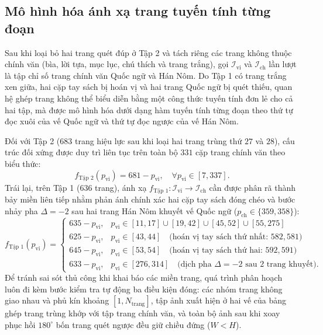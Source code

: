 \subsection{Mô hình hóa ánh xạ trang tuyến tính từng đoạn}

Sau khi loại bỏ hai trang quét đúp ở Tập 2 và tách riêng các trang không thuộc chính văn (bìa, lời tựa, mục lục, chú thích và trang trắng), gọi $\mathcal{I}_{\text{vi}}$ và $\mathcal{I}_{\text{ch}}$ lần lượt là tập chỉ số trang chính văn Quốc ngữ và Hán Nôm. Do Tập 1 có trang trắng xen giữa, hai cặp tay sách bị hoán vị và hai trang Quốc ngữ bị quét thiếu, quan hệ ghép trang không thể biểu diễn bằng một công thức tuyến tính đơn lẻ cho cả hai tập, mà được mô hình hóa dưới dạng hàm tuyến tính từng đoạn theo thứ tự đọc xuôi của vế Quốc ngữ và thứ tự đọc ngược của vế Hán Nôm.

Đối với Tập 2 ($683$ trang hiệu lực sau khi loại hai trang trùng thứ $27$ và $28$), cấu trúc đối xứng được duy trì liên tục trên toàn bộ $331$ cặp trang chính văn theo biểu thức:
\begin{equation}
    f_{\text{Tập 2}}(p_{\text{vi}}) = 681 - p_{\text{vi}}, \quad \forall p_{\text{vi}} \in [7, 337].
\end{equation}
Trái lại, trên Tập 1 ($636$ trang), ánh xạ $f_{\text{Tập 1}}: \mathcal{I}_{\text{vi}} \to \mathcal{I}_{\text{ch}}$ cần được phân rã thành bảy miền liên tiếp nhằm phản ánh chính xác hai cặp tay sách đóng chéo và bước nhảy pha $\Delta = -2$ sau hai trang Hán Nôm khuyết vế Quốc ngữ ($p_{\text{ch}} \in \{359, 358\}$):
\begin{equation}
    f_{\text{Tập 1}}(p_{\text{vi}}) =
    \begin{cases}
        635 - p_{\text{vi}}, & p_{\text{vi}} \in [11, 17] \cup [19, 42] \cup [45, 52] \cup [55, 275] \\
        625 - p_{\text{vi}}, & p_{\text{vi}} \in [43, 44] \quad \text{(hoán vị tay sách thứ nhất: } 582, 581\text{)} \\
        645 - p_{\text{vi}}, & p_{\text{vi}} \in [53, 54] \quad \text{(hoán vị tay sách thứ hai: } 592, 591\text{)} \\
        633 - p_{\text{vi}}, & p_{\text{vi}} \in [276, 314] \quad \text{(dịch pha } \Delta = -2 \text{ sau } 2 \text{ trang khuyết).}
    \end{cases}
\end{equation}
Để tránh sai sót thủ công khi khai báo các miền trang, quá trình phân hoạch luôn đi kèm bước kiểm tra tự động ba điều kiện đóng: các nhóm trang không giao nhau và phủ kín khoảng $[1, N_{\text{trang}}]$, tập ảnh xuất hiện ở hai vế của bảng ghép trang trùng khớp với tập trang chính văn, và toàn bộ ảnh sau khi xoay phục hồi $180^\circ$ bốn trang quét ngược đều giữ chiều đứng ($W < H$).


